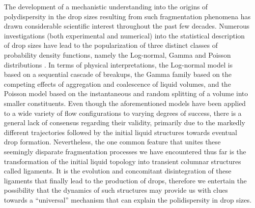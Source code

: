 The development of a mechanistic understanding into the origins of polydispersity in the drop sizes  
resulting from such fragmentation phenomena has drawn considerable scientific interest throughout the past few decades.
Numerous investigations (both experimental and numerical) into the statistical description of drop sizes
have lead to the popularization of three distinct classes of probability density functions, 
namely the Log-normal, Gamma and Poisson distributions \cite{vill_1}.  
In terms of physical interpretations, the Log-normal model \cite{log_normal} is based on a sequential cascade
of breakups, the Gamma family \cite{vill_2} based on the competing effects of aggregation and coalescence of liquid volumes, 
and the Poisson model \cite{poisson} based on the instantaneous and random splitting of a volume into smaller constituents.  
Even though the aforementioned models have been applied to a wide variety of flow configurations
to varying degrees of success, there is a general lack of consensus regarding their validity, primarily 
due to the markedly different trajectories  
followed by the initial liquid structures towards eventual drop formation. 
Nevertheless, the one common feature that unites these seemingly disparate 
fragmentation processes we have encountered thus far is the transformation 
of the initial liquid topology into transient columnar structures called ligaments. 
It is the evolution and concomitant disintegration of these ligaments 
that finally lead to the production of drops, therefore we entertain 
the possibility that the dynamics of such structures may provide us with clues 
towards a ``universal'' mechanism that can explain the polidispersity in drop sizes. 

